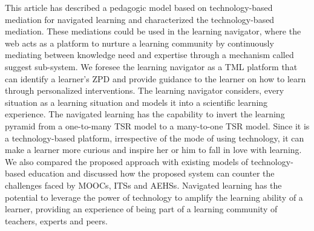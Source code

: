 \begin{multicols}{2}
This article has described a pedagogic model based on technology-based mediation for navigated learning and characterized the technology-based mediation. These mediations could be used in the learning navigator, where the web acts as a platform to nurture a learning community by continuously mediating between knowledge need and expertise through a mechanism called suggest sub-system. We foresee the learning navigator as a TML platform that can identify a learner’s ZPD and provide guidance to the learner on how to learn through personalized interventions. The learning navigator considers, every situation as a learning situation and models it into a scientific learning experience. The navigated learning has the capability to invert the learning pyramid from a one-to-many TSR model to a many-to-one TSR model. Since it is a technology-based platform, irrespective of the mode of using technology, it can make a learner more curious and inspire her or him to fall in love with learning. We also compared the proposed approach with existing models of technology-based education and discussed how the proposed system can counter the challenges faced by MOOCs, ITSs and AEHSs. Navigated learning has the potential to leverage the power of technology to amplify the learning ability of a learner, providing an experience of being part of a learning community of teachers, experts and peers.


\end{multicols}
